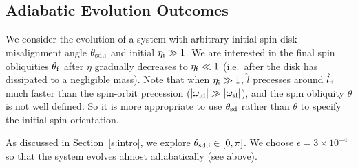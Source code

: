 \documentclass[
        fleqn,
        usenatbib,
        referee,
    ]{mnras}
\newcommand*{\abs}[1]{\left|#1\right|}
\begin{document}
\subsection{Adiabatic Evolution Outcomes}\label{ss:ad_ensemble}

We consider the evolution of a system with arbitrary initial spin-disk
misalignment angle $\theta_{\rm sd, i}$ and initial $\eta_{\rm i} \gg 1$. We are
interested in the final spin obliquities $\theta_{\rm f}$ after $\eta$ gradually
decreases to $\eta_{\rm f} \ll 1$ (i.e.\ after the disk has dissipated to a
negligible mass). Note that when $\eta_{\rm i} \gg 1$, $\hat{l}$ precesses
around $\hat{l}_{\rm d}$ much faster than the spin-orbit precession
($\abs{\omega_{\rm ld}} \gg \abs{\omega_{\rm sl}}$), and the spin obliquity
$\theta$ is not well defined. So it is more appropriate to use $\theta_{\rm sd}$
rather than $\theta$ to specify the initial spin orientation.

As discussed in Section~\ref{s:intro}, we explore $\theta_{\rm sd, i} \in [0,
\pi]$. We choose $\epsilon = 3 \times 10^{-4}$ so that the system evolves almost
adiabatically (see above).
\end{document}
